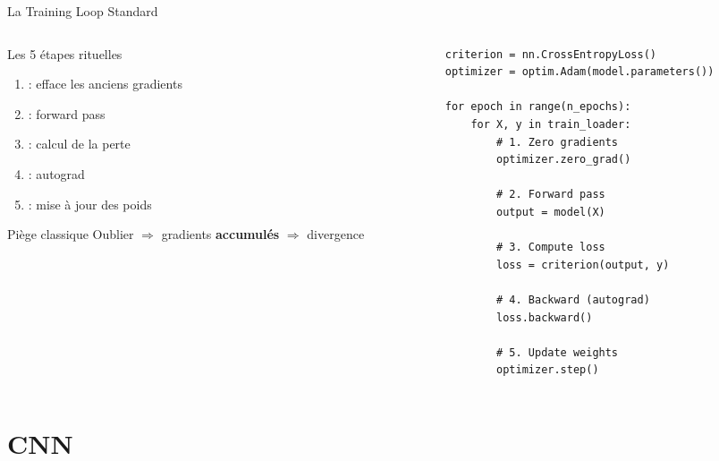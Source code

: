 \documentclass[aspectratio=169, 10pt]{beamer}
\begin{document}
\begin{frame}[fragile]{La Training Loop Standard}
  \begin{columns}[T]
    \begin{column}{0.37\textwidth}
      \begin{block}{Les 5 étapes rituelles}
        \begin{enumerate}\small
          \item {} : efface les anciens gradients
          \item {} : forward pass
          \item {} : calcul de la perte
          \item {} : autograd
          \item {} : mise à jour des poids
        \end{enumerate}
      \end{block}
      \smallskip
      \begin{alertblock}{\small Piège classique}
        \small Oublier  $\Rightarrow$ gradients \textbf{accumulés} $\Rightarrow$ divergence
      \end{alertblock}
    \end{column}
    \begin{column}{0.59\textwidth}
      \begin{lstlisting}[style=pythonstyle]
criterion = nn.CrossEntropyLoss()
optimizer = optim.Adam(model.parameters())

for epoch in range(n_epochs):
    for X, y in train_loader:
        # 1. Zero gradients
        optimizer.zero_grad()

        # 2. Forward pass
        output = model(X)

        # 3. Compute loss
        loss = criterion(output, y)

        # 4. Backward (autograd)
        loss.backward()

        # 5. Update weights
        optimizer.step()
      \end{lstlisting}
    \end{column}
  \end{columns}
\end{frame}

\section{CNN}
\end{document}

